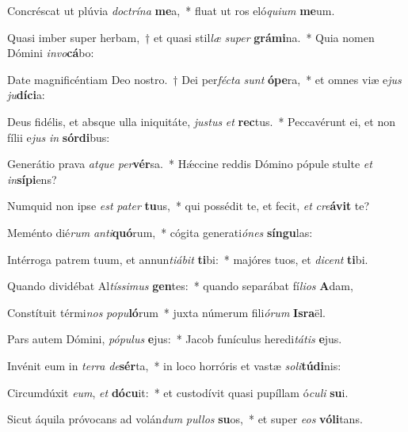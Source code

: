 \item Concréscat ut plúvia \textit{doc}\textit{trí}\textit{na} \textbf{me}a,~* fluat ut ros eló\textit{qui}\textit{um} \textbf{me}um.
\item Quasi imber super herbam,~† et quasi stil\textit{læ} \textit{su}\textit{per} \textbf{grá}\textbf{mi}na.~* Quia nomen Dómini \textit{in}\textit{vo}\textbf{cá}bo:
\item Date magnificéntiam Deo nostro.~† Dei per\textit{féc}\textit{ta} \textit{sunt} \textbf{ó}\textbf{pe}ra,~* et omnes viæ e\textit{jus} \textit{ju}\textbf{dí}\textbf{ci}a:
\item Deus fidélis, et absque ulla iniquitáte, \textit{jus}\textit{tus} \textit{et} \textbf{rec}tus.~* Peccavérunt ei, et non fílii e\textit{jus} \textit{in} \textbf{sór}\textbf{di}bus:
\item Generátio prava \textit{at}\textit{que} \textit{per}\textbf{vér}sa.~* Hǽccine reddis Dómino pópule stulte \textit{et} \textit{in}\textbf{sí}\textbf{pi}ens?
\item Numquid non ipse \textit{est} \textit{pa}\textit{ter} \textbf{tu}us,~* qui possédit te, et fecit, \textit{et} \textit{cre}\textbf{á}\textbf{vit} te?
\item Meménto dié\textit{rum} \textit{an}\textit{ti}\textbf{quó}rum,~* cógita generati\textit{ó}\textit{nes} \textbf{sín}\textbf{gu}las:
\item Intérroga patrem tuum, et annun\textit{ti}\textit{á}\textit{bit} \textbf{ti}bi:~* majóres tuos, et \textit{di}\textit{cent} \textbf{ti}bi.
\item Quando dividébat Al\textit{tís}\textit{si}\textit{mus} \textbf{gen}tes:~* quando separábat fí\textit{li}\textit{os} \textbf{A}dam,
\item Constítuit térmi\textit{nos} \textit{po}\textit{pu}\textbf{ló}rum~* juxta númerum fili\textit{ó}\textit{rum} \textbf{Is}\textbf{ra}ël.
\item Pars autem Dómini, \textit{pó}\textit{pu}\textit{lus} \textbf{e}jus:~* Jacob funículus heredi\textit{tá}\textit{tis} \textbf{e}jus.
\item Invénit eum in \textit{ter}\textit{ra} \textit{de}\textbf{sér}ta,~* in loco horróris et vastæ \textit{so}\textit{li}\textbf{tú}\textbf{di}nis:
\item Circumdúxit \textit{e}\textit{um}, \textit{et} \textbf{dó}\textbf{cu}it:~* et custodívit quasi pupíllam ó\textit{cu}\textit{li} \textbf{su}i.
\item Sicut áquila próvocans ad volán\textit{dum} \textit{pul}\textit{los} \textbf{su}os,~* et super \textit{e}\textit{os} \textbf{vó}\textbf{li}tans.
